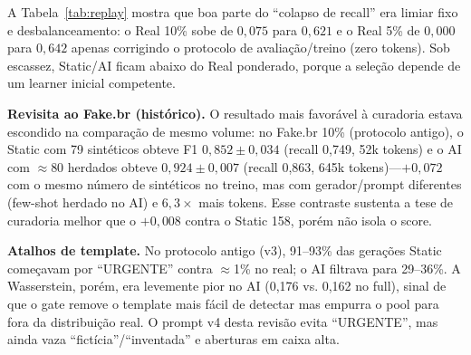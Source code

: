 \documentclass[conference]{IEEEtran}
\begin{document}
\begin{table}[t]
\caption{Replay dos pools antigos com ponderação e limiar (vs. protocolo antigo).}
\label{tab:replay}
\centering
{}
\end{table}

A Tabela~\ref{tab:replay} mostra que boa parte do ``colapso de recall'' era limiar fixo e desbalanceamento: o Real 10\% sobe de $0{,}075$ para $0{,}621$ e o Real 5\% de $0{,}000$ para $0{,}642$ apenas corrigindo o protocolo de avaliação/treino (zero tokens). Sob escassez, Static/AI ficam abaixo do Real ponderado, porque a seleção depende de um learner inicial competente.

\textbf{Revisita ao Fake.br (histórico).} O resultado mais favorável à curadoria estava escondido na comparação de mesmo volume: no Fake.br 10\% (protocolo antigo), o Static com 79 sintéticos obteve F1 $0{,}852\pm0{,}034$ (recall 0,749, 52k tokens) e o AI com $\approx$80 herdados obteve $0{,}924\pm0{,}007$ (recall 0,863, 645k tokens)---$+0{,}072$ com o mesmo número de sintéticos no treino, mas com gerador/prompt diferentes (few-shot herdado no AI) e $6{,}3\times$ mais tokens. Esse contraste sustenta a tese de curadoria melhor que o $+0{,}008$ contra o Static 158, porém não isola o score.

\textbf{Atalhos de template.} No protocolo antigo (v3), 91--93\% das gerações Static começavam por ``URGENTE'' contra $\approx$1\% no real; o AI filtrava para 29--36\%. A Wasserstein, porém, era levemente pior no AI (0,176 vs. 0,162 no full), sinal de que o gate remove o template mais fácil de detectar mas empurra o pool para fora da distribuição real. O prompt v4 desta revisão evita ``URGENTE'', mas ainda vaza ``fictícia''/``inventada'' e aberturas em caixa alta.
\end{document}
